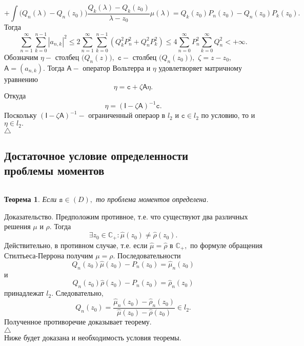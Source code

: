 \documentclass[12 pt, a4 paper]{article}
\theoremstyle{plain}   \newtheorem{Pro}{Задача}
\newtheorem{The}{Теорема}
\begin{document}
$$
  +\int \biggl ( Q_n (\lambda )-Q_n (z_0 ) \biggr )
  \frac{Q_k (\lambda )-Q_k (z_0 )}{\lambda -z_0 } \mu (\lambda ) =
  Q_k (z_0 )P_n (z_0 ) -Q_n (z_0 )P_k (z_0 ).
$$
Тогда
$$
  \sum _{n=1}^{\infty} \sum _{k=0}^{n-1} |a_{n,k}|^2 \leq
  2 \sum _{n=1}^{\infty}\sum _{k=0}^{n-1}
  (Q_k ^2 P_n ^2 +Q_n ^2 P_k ^2 ) \leq
  4\sum_{n=0}^{\infty} P_n ^2 \sum _{k=0}^{\infty} Q_n ^2
  < +\infty .
$$
Обозначим
$ \mathtt{\eta} - $
столбец
$ \bigl ( Q_n (z) \bigr ) , $
$ \mathtt{c} - $
столбец
$ \bigl ( Q_n (z_0 ) \bigr ) , $
$ \zeta =z-z_0 , $
$ \mathsf{A} = (a_{n,k}). $
Тогда
$ \mathsf{A} - $
оператор Вольтерра и
$ \mathtt{\eta} $
удовлетворяет матричному уравнению
$$
 \mathtt{\eta} =\mathtt{c}+ \zeta \mathsf{A} \mathtt{\eta} .
$$
Откуда
$$
  \mathtt{\eta} = ( \mathsf{I}-\zeta \mathsf{A})^{-1} \mathtt{c} .
$$
Поскольку
$ ( \mathsf{I}-\zeta \mathsf{A})^{-1} - $
ограниченный операор в
$ l_2 $
и
$ \mathtt{c} \in l_2  $
по условию, то и
$ \mathtt{\eta} \in l_2 . $
\\
$ \triangle $
\newpage
\subsection{Достаточное условие определенности \\
проблемы моментов}
$ \; $
\\
\begin{The}
Если
$ \mathtt{s} \in (D) , $
то проблема моментов определена.
\end{The}
{\Large Доказательство.}
Предположим противное, т.е. что существуют два различных решения
$ \mu $
и
$ \rho . $
Тогда
$$
  \exists z_0 \in \mathbb{C}_+ :
  \hat \mu (z_0 ) \not = \hat \rho ( z_0 ) .
$$
Действительно, в противном случае, т.е. если
$ \hat \mu = \hat \rho $
в
$ \mathbb{C}_+ , $
по формуле обращения Стилтьеса-Перрона получим
$ \mu = \rho . $
Последовательности
$$
  Q_n (z_0 )\hat \mu (z_0 )-P_n (z_0 ) = \hat \mu _n (z_0 )
$$
и
$$
  Q_n (z_0 ) \hat \rho ( z_0 ) -P_n (z_0 ) = \hat \rho _n (z_0 )
$$
принадлежат
$ l_2 . $
Следовательно,
$$
  Q_n (z_0 ) =\frac{\hat \mu _n (z_0 ) - \hat \rho _n ( z_0 ) }
  {\hat \mu (z_0 ) -\hat \rho (z_0 )} \in l_2 .
$$
Полученное противоречие доказывает теорему.
\\
$ \triangle $
\\
Ниже будет доказана и необходимость условия теоремы.
\newpage
\end{document}
